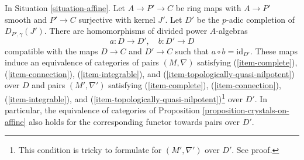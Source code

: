 \begin{lemma}
\label{lemma-crystals-on-affine-smooth}
In Situation \ref{situation-affine}.
Let $A \to P' \to C$ be ring maps with $A \to P'$ smooth and $P' \to C$
surjective with kernel $J'$. Let $D'$ be the $p$-adic completion of
$D_{P', \gamma}(J')$. There are homomorphisms of divided power $A$-algebras
$$
a : D \longrightarrow D',\quad b : D' \longrightarrow D
$$
compatible with the maps $D \to C$ and $D' \to C$ such that
$a \circ b = \text{id}_{D'}$. These maps induce
an equivalence of categories of pairs $(M, \nabla)$ satisfying
(\ref{item-complete}), (\ref{item-connection}),
(\ref{item-integrable}), and (\ref{item-topologically-quasi-nilpotent})
over $D$ and pairs $(M', \nabla')$  satisfying
(\ref{item-complete}), (\ref{item-connection}),
(\ref{item-integrable}), and
(\ref{item-topologically-quasi-nilpotent})\footnote{This condition
is tricky to formulate for $(M', \nabla')$ over $D'$. See proof.} over $D'$.
In particular, the equivalence of categories of
Proposition \ref{proposition-crystals-on-affine}
also holds for the corresponding functor towards pairs over $D'$.
\end{lemma}

